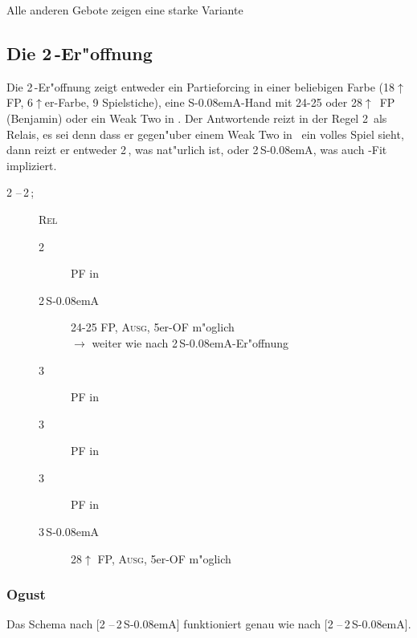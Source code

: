 \documentclass[11pt,german,twocolumn]{scrartcl}
\def\pik{\nobreak\,\Sp\xspace}
\def\coe{\nobreak\,\He\xspace}
\def\kar{\nobreak\,\Di\xspace}
\def\tre{\nobreak\,\Cl\xspace}
\def\co{\He\xspace}
\def\ka{\Di\xspace}
\def\ra{$\rightarrow$\xspace}
\def\pl{$\uparrow$\xspace}
\def\ofa{\nobreak\textsf{OF}\xspace}
\def\sa{\nobreak\textsf{S\kern-0.08emA}\xspace}
\def\SA{\nobreak\,\sa}
\def\sep{\,--\,}
\def\bal{\textsc{Ausg}\xspace}
\def\pf{\textsc{PF}\xspace}
\def\rel{\textsc{Rel}\xspace}
\def\bdsc{\begin{description}}
\def\edsc{\end{description}}
\newcommand{\Index}[1]{#1\index{#1}}
\begin{document}
Alle anderen Gebote zeigen eine starke Variante

\subsection{Die 2\kar-Er"offnung}

Die 2\kar-Er"offnung zeigt entweder ein Partieforcing in einer beliebigen Farbe
(18\pl FP, 6\pl{}er-Farbe, 9 Spielstiche), eine \sa-Hand mit 24-25 oder
28\pl~FP (Benjamin) oder ein \Index{Weak Two} in \co. Der Antwortende reizt in der
Regel 2\coe als Relais, es sei denn dass er gegen"uber einem Weak Two in \ka\
ein volles Spiel sieht, dann reizt er entweder 2\pik, was nat"urlich ist, oder
2\SA, was auch \co-Fit impliziert.

\bdsc
\item[2\kar{}\sep2\coe;] \rel
  \bdsc
  \item[2\pik] \pf in \pik
  \item[2\SA] 24-25 FP, \bal, 5er-\ofa m"oglich \\
    \ra weiter wie nach 2\SA-Er"offnung
  \item[3\tre] \pf in \tre
  \item[3\kar] \pf in \kar
  \item[3\coe] \pf in \coe
  \item[3\SA] 28\pl FP, \bal, 5er-\ofa m"oglich
  \edsc
\edsc

\subsubsection{Ogust}

Das Schema nach [2\kar{}\sep2\SA] funktioniert genau wie nach [2\tre{}\sep2\SA].
\end{document}
